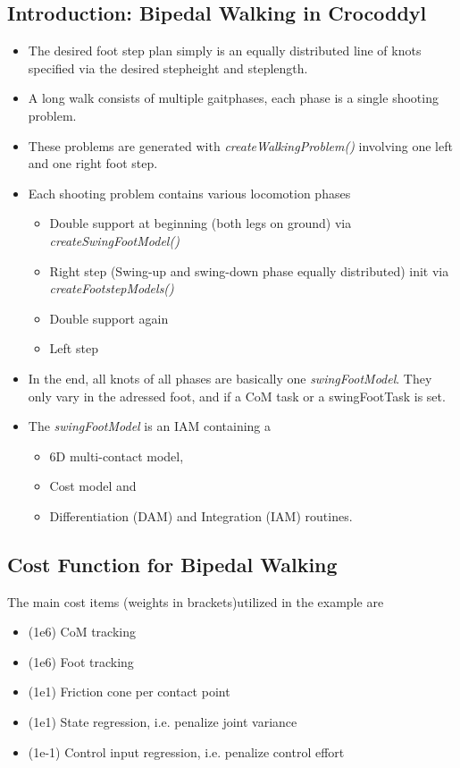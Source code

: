 \subsection{Introduction: Bipedal Walking in Crocoddyl}\label{sec:IntroBipedWalk}
\begin{itemize}
\item The desired foot step plan simply is an equally distributed line of knots specified via the desired stepheight and steplength. 
\item A long walk consists of multiple gaitphases, each phase is a single shooting problem.
\item These problems are generated with \textit{createWalkingProblem()} involving one left and one right foot step.
\item Each shooting problem contains various locomotion phases
	\begin{itemize}
	\item Double support at beginning (both legs on ground) via \textit{createSwingFootModel()}
	\item Right step (Swing-up and swing-down phase equally distributed) init via    	\textit{createFootstepModels()}
	\item Double support again
	\item Left step
	\end{itemize}	
\item In the end, all knots of all phases are basically one \textit{swingFootModel}. They only vary in the adressed foot, and if a CoM task or a swingFootTask is set.
\item The \textit{swingFootModel} is an IAM containing a 
	\begin{itemize}
	\item 6D multi-contact model,
	\item Cost model and
	\item Differentiation (DAM) and Integration (IAM) routines.
	\end{itemize}
\end{itemize}

\subsection{Cost Function for Bipedal Walking}
The main cost items (weights in brackets)utilized in the example are 
\begin{itemize}
\item (1e6) CoM tracking
\item (1e6) Foot tracking
\item (1e1) Friction cone per contact point
\item (1e1) State regression, i.e. penalize joint variance
\item (1e-1) Control input regression, i.e. penalize control effort
\end{itemize}

